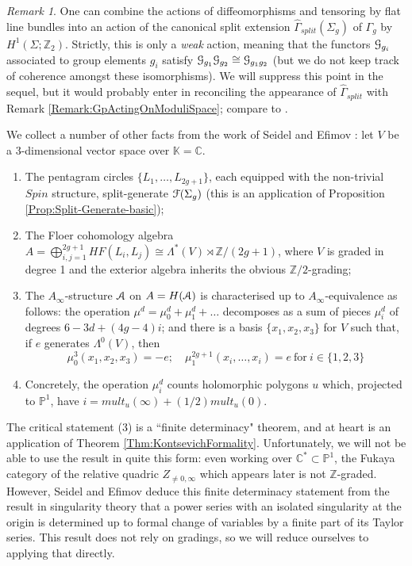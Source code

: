 \documentclass[reqno,10pt]{amsart}
\numberwithin{equation}{section}
\newcommand{\bC}{{\mathbb C}}
\newcommand{\bK}{{\mathbb K}}
\newcommand{\bP}{{\mathbb P}}
\newcommand{\bZ}{{\mathbb Z}}
\newcommand{\scrG}{\EuScript{G}}
\newcommand{\scrF}{\EuScript{F}}
\newcommand{\scrA}{\EuScript{A}}
\theoremstyle{remark}
\newtheorem{Remark}[thm]{Remark}
\begin{document}
\begin{Remark} \label{Remark:GpActingOnCurve}
One can combine the actions of diffeomorphisms and tensoring by flat line bundles into an action of the canonical split extension $\widehat{\Gamma}_{split}(\Sigma_g)$ of $\Gamma_g$ by $H^1(\Sigma;\bZ_2)$.  Strictly, this is only a \emph{weak} action, meaning that the functors $\scrG_{g_i}$  associated to group elements $g_i$ satisfy $\scrG_{g_1}\scrG_{g_2} \cong \scrG_{g_1g_2}$ (but we do not keep track of coherence amongst these isomorphisms).    We will suppress this point in the sequel, but it would probably enter in reconciling the appearance of $\widehat{\Gamma}_{split}$ with Remark \ref{Remark:GpActingOnModuliSpace}; compare to \cite[Remark 10.4]{FCPLT}.
\end{Remark}

We collect a number of other facts from the work of Seidel \cite{Seidel:HMSgenus2} and Efimov \cite{Efimov}:  let $V$ be a 3-dimensional vector space over $\bK = \bC$. 
\begin{enumerate}
\item The pentagram circles $\{L_1,\ldots, L_{2g+1}\}$, each equipped with the non-trivial $Spin$ structure, split-generate $\scrF(\Sigma_g)$ (this is an application of Proposition \ref{Prop:Split-Generate-basic});
\item The Floer cohomology algebra $A=\bigoplus_{i,j=1}^{2g+1} HF(L_i, L_j) \cong \Lambda^*(V) \rtimes \bZ/(2g+1)$, where $V$ is graded in degree 1 and the exterior algebra inherits the obvious $\bZ/2$-grading;
\item The $A_{\infty}$-structure $\scrA$ on $A=H(\scrA)$ is characterised up to $A_{\infty}$-equivalence as follows: the operation $\mu^d = \mu^d_0 + \mu^d_1 + \ldots $ decomposes as a sum of pieces $\mu^d_i$ of degrees $6-3d+(4g-4)i$; and there is a basis $\{x_1, x_2, x_3\}$ for $V$ such that, if $e$ generates $\Lambda^0(V)$, then
\begin{equation} \label{Eqn:AinftyCurve}
\mu^3_0 (x_1,x_2,x_3) = -e; \quad \mu^{2g+1}_1 (x_i, \ldots, x_i) = e \ \textrm{for} \  i\in \{1,2,3\}
\end{equation}
\item Concretely, the operation $\mu^d_i$ counts holomorphic polygons $u$ which, projected to $\bP^1$, have $i = mult_u(\infty) + (1/2) mult_u(0)$.
\end{enumerate}

The critical statement (3) is a ``finite determinacy" theorem, and at heart is an application of Theorem \ref{Thm:KontsevichFormality}.  Unfortunately, we will not be able to use the result in quite this form:  even working over $\bC^*\subset \bP^1$, the Fukaya category of the relative quadric $Z_{\neq 0,\infty}$ which appears later is not $\bZ$-graded.    However, Seidel and Efimov deduce this finite determinacy statement from the result in singularity theory that a power series with an isolated singularity at the origin is determined up to formal change of variables by a finite part of its Taylor series.  This result does not rely on gradings, so we will reduce ourselves to applying that directly. 
\end{document}
